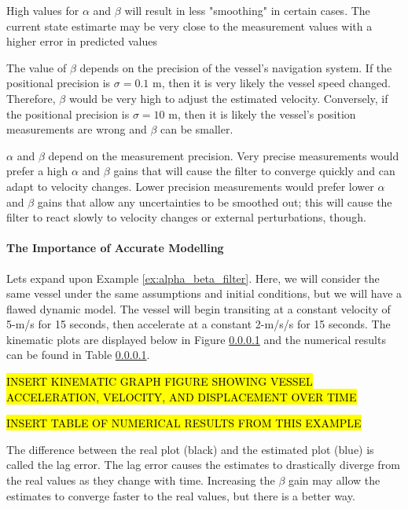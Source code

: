 
        \begin{kaobox}[frametitle=Aside: The $\alpha$ and $\beta$ Gains]
            High values for $\alpha$ and $\beta$ will result in less "smoothing" in certain cases.
            The current state estimarte may be very close to the measurement values with a higher error in predicted values

            The value of $\beta$ depends on the precision of the vessel's navigation system.
            If the positional precision is $\sigma = 0.1 \text{ m}$, then it is very likely the vessel speed changed.
            Therefore, $\beta$ would be very high to adjust the estimated velocity.
            Conversely, if the positional precision is $\sigma = 10 \text{ m}$, then it is likely the vessel's position measurements are wrong and $\beta$ can be smaller.

            $\alpha$ and $\beta$ depend on the measurement precision.
            Very precise measurements would prefer a high $\alpha$ and $\beta$ gains that will cause the filter to converge quickly and can adapt to velocity changes.
            Lower precision measurements would prefer lower $\alpha$ and $\beta$ gains that allow any uncertainties to be smoothed out; this will cause the filter to react slowly to velocity changes or external perturbations, though.
        \end{kaobox}

        \paragraph{The Importance of Accurate Modelling} Lets expand upon Example \ref{ex:alpha_beta_filter}.
        Here, we will consider the same vessel under the same assumptions and initial conditions, but we will have a flawed dynamic model.
        The vessel will begin transiting at a constant velocity of 5-m/s for 15 seconds, then accelerate at a constant 2-m/s/s for 15 seconds.
        The kinematic plots are displayed below in Figure \ref{} and the numerical results can be found in Table \ref{}.

        \hl{INSERT KINEMATIC GRAPH FIGURE SHOWING VESSEL ACCELERATION, VELOCITY, AND DISPLACEMENT OVER TIME}

        \hl{INSERT TABLE OF NUMERICAL RESULTS FROM THIS EXAMPLE}

        The difference between the real plot (black) and the estimated plot (blue) is called the lag error.
        The lag error causes the estimates to drastically diverge from the real values as they change with time.
        Increasing the $\beta$ gain may allow the estimates to converge faster to the real values, but there is a better way.

